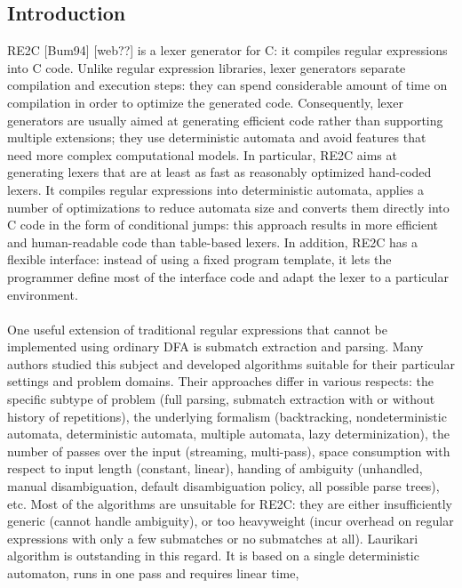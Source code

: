\documentclass{article}
\theoremstyle{definition}
\begin{document}
\begin{multicols}{2}

\section*{Introduction}

RE2C [Bum94] [web??] is a lexer generator for C: it compiles regular expressions into C code.
Unlike regular expression libraries, lexer generators separate compilation and execution steps:
they can spend considerable amount of time on compilation in order to optimize the generated code.
Consequently, lexer generators are usually aimed at generating efficient code rather than supporting multiple extensions;
they use deterministic automata and avoid features that need more complex computational models.
In particular, RE2C aims at generating lexers that are at least as fast as reasonably optimized hand-coded lexers.
It compiles regular expressions into deterministic automata,
applies a number of optimizations to reduce automata size
and converts them directly into C code in the form of conditional jumps:
this approach results in more efficient and human-readable code than table-based lexers.
In addition, RE2C has a flexible interface:
instead of using a fixed program template,
it lets the programmer define most of the interface code
and adapt the lexer to a particular environment.
\\ \\
One useful extension of traditional regular expressions that cannot be implemented using ordinary DFA is submatch extraction and parsing.
Many authors studied this subject and developed algorithms suitable for their particular settings and problem domains.
Their approaches differ in various respects:
the specific subtype of problem (full parsing, submatch extraction with or without history of repetitions),
the underlying formalism (backtracking,
nondeterministic automata, deterministic automata, 
multiple automata, lazy determinization),
the number of passes over the input (streaming, multi-pass),
space consumption with respect to input length (constant, linear),
handing of ambiguity (unhandled, manual disambiguation, default disambiguation policy, all possible parse trees), etc.
Most of the algorithms are unsuitable for RE2C: they are either insufficiently generic (cannot handle ambiguity),
or too heavyweight (incur overhead on regular expressions with only a few submatches or no submatches at all).
Laurikari algorithm is outstanding in this regard.
It is based on a single deterministic automaton, runs in one pass and requires linear time,

\end{multicols}
\end{document}
